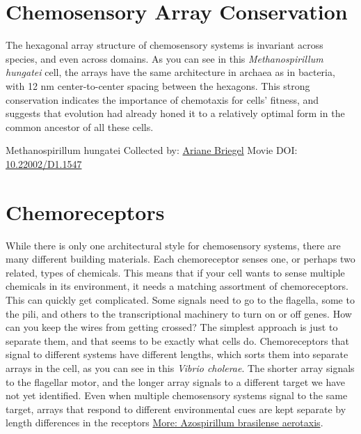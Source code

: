 \documentclass[]{tufte-book}
\begin{document}
\hypertarget{chemosensory-array-conservation}{%
\section{Chemosensory Array Conservation}\label{chemosensory-array-conservation}}

The hexagonal array structure of chemosensory systems is invariant across species, and even across domains. As you can see in this \emph{Methanospirillum hungatei} cell, the arrays have the same architecture in archaea as in bacteria, with 12 nm center-to-center spacing between the hexagons. This strong conservation indicates the importance of chemotaxis for cells' fitness, and suggests that evolution had already honed it to a relatively optimal form in the common ancestor of all these cells.



\hypertarget{htmlwidget-2b5d153318718a9e2e26}{}

\label{fig:7-3}Methanospirillum hungatei Collected by: \protect\hyperlink{ariane_briegel}{Ariane Briegel} Movie DOI: \href{https://doi.org/10.22002/D1.1547}{10.22002/D1.1547}

\hypertarget{chemoreceptors}{%
\section{Chemoreceptors}\label{chemoreceptors}}

While there is only one architectural style for chemosensory systems, there are many different building materials. Each chemoreceptor senses one, or perhaps two related, types of chemicals. This means that if your cell wants to sense multiple chemicals in its environment, it needs a matching assortment of chemoreceptors. This can quickly get complicated. Some signals need to go to the flagella, some to the pili, and others to the transcriptional machinery to turn on or off genes. How can you keep the wires from getting crossed? The simplest approach is just to separate them, and that seems to be exactly what cells do. Chemoreceptors that signal to different systems have different lengths, which sorts them into separate arrays in the cell, as you can see in this \emph{Vibrio cholerae}. The shorter array signals to the flagellar motor, and the longer array signals to a different target we have not yet identified. Even when multiple chemosensory systems signal to the same target, arrays that respond to different environmental cues are kept separate by length differences in the receptors \protect\hyperlink{Azospirillum_brasilense_aerotaxis}{More: Azospirillum brasilense aerotaxis}.
\end{document}
